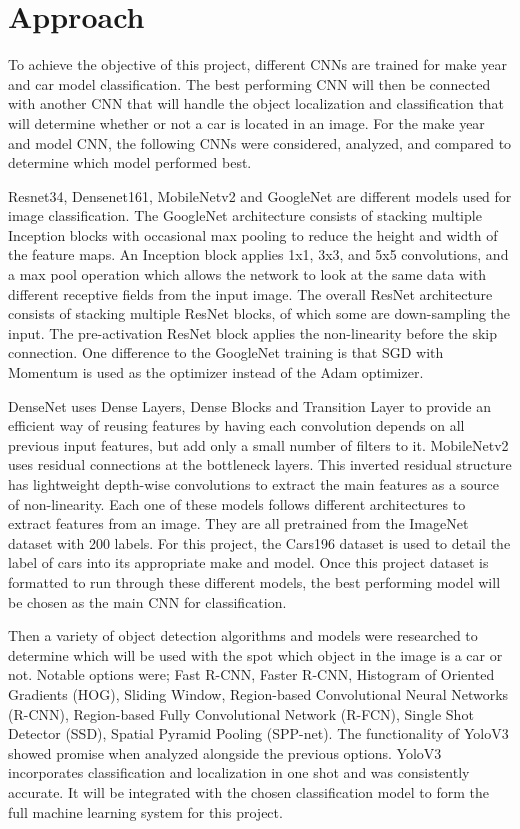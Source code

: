 \documentclass[conference]{IEEEtran}
\begin{document}
\section{Approach} \label{Approach}
	To achieve the objective of this project, different CNNs are trained for make year and car model classification. The best performing CNN will then be connected with another CNN that will handle the object localization and classification that will determine whether or not a car is located in an image. For the make year and model CNN, the following CNNs were considered, analyzed, and compared to determine which model performed best.  

	Resnet34, Densenet161, MobileNetv2 and GoogleNet are different models used for image classification. The GoogleNet architecture consists of stacking multiple Inception blocks with occasional  
max pooling to reduce the height and width of the feature maps. An Inception block applies 1x1, 3x3, and 5x5 convolutions, and a max pool operation which allows the network to look at the same data with different receptive fields from the input image. The overall ResNet architecture consists of stacking multiple ResNet blocks, of which some are down-sampling the input. The pre-activation ResNet block applies the non-linearity before the skip connection. One difference to the GoogleNet training is that SGD with Momentum is used as the optimizer instead of the Adam optimizer. 

DenseNet uses Dense Layers, Dense Blocks and Transition Layer to provide an efficient way of reusing features by having each convolution depends on all previous input features, but add only a small number of filters to it. MobileNetv2 uses residual connections at the bottleneck layers. This inverted residual structure has lightweight depth-wise convolutions to extract the main features as a source of non-linearity. Each one of these models follows different architectures to extract features from an image. They are all pretrained from the ImageNet dataset with 200 labels. For this project, the Cars196 dataset is used to detail the label of cars into its appropriate make and model. Once this project dataset is formatted to run through these different models, the best performing model will be chosen as the main CNN for classification.  

Then a variety of object detection algorithms and models were researched to determine which will be used with the spot which object in the image is a car or not. Notable options were; Fast R-CNN, Faster R-CNN, Histogram of Oriented Gradients (HOG), Sliding Window, Region-based Convolutional Neural Networks (R-CNN), Region-based Fully Convolutional Network (R-FCN), Single Shot Detector (SSD), Spatial Pyramid Pooling (SPP-net). The functionality of YoloV3 showed promise when analyzed alongside the previous options. YoloV3 incorporates classification and localization in one shot and was consistently accurate. It will be integrated with the chosen classification model to form the full machine learning system for this project.  
\end{document}
